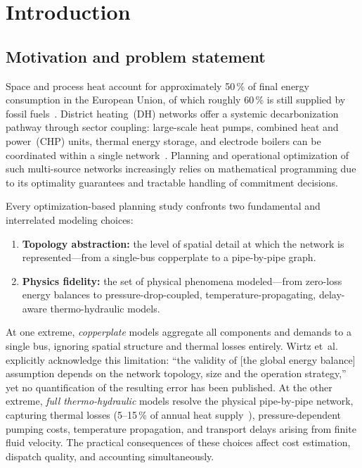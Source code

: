 \documentclass[review,3p]{elsarticle}
\begin{document}
\section{Introduction}
\label{sec:introduction}

\subsection{Motivation and problem statement}
\label{sec:motivation}

Space and process heat account for approximately 50\,\% of final
energy consumption in the European Union, of which roughly 60\,\% is
still supplied by fossil fuels~\cite{EUheating2016}. District
heating~(DH) networks offer a systemic decarbonization pathway
through sector coupling: large-scale heat pumps, combined heat and
power~(CHP) units, thermal energy storage, and electrode boilers can
be coordinated within a single network~\cite{Lund2014_4GDH,Werner2017}.
Planning and operational optimization of such multi-source networks
increasingly relies on mathematical programming due to its optimality
guarantees and tractable handling of commitment decisions.

Every optimization-based planning study confronts two fundamental and
interrelated modeling choices:
%
\begin{enumerate}[nosep]
  \item \textbf{Topology abstraction:} the level of spatial detail at
        which the network is represented---from a single-bus
        copperplate to a pipe-by-pipe graph.
  \item \textbf{Physics fidelity:} the set of physical phenomena
        modeled---from zero-loss energy balances to
        pressure-drop-coupled, temperature-propagating, delay-aware
        thermo-hydraulic models.
\end{enumerate}

At one extreme, \emph{copperplate} models aggregate all components
and demands to a single bus, ignoring spatial structure and thermal
losses entirely. Wirtz et~al.~\cite{Wirtz2020} explicitly acknowledge
this limitation: ``the validity of [the global energy balance]
assumption depends on the network topology, size and the operation
strategy,'' yet no quantification of the resulting error has been
published. At the other extreme, \emph{full thermo-hydraulic} models
resolve the physical pipe-by-pipe network, capturing thermal losses
(5--15\,\% of annual heat
supply~\cite{Frederiksen2013,Talebi2016}), pressure-dependent
pumping costs, temperature propagation, and transport delays arising
from finite fluid velocity. The practical consequences of these
choices affect cost estimation, dispatch quality, and 
accounting simultaneously.
\end{document}
